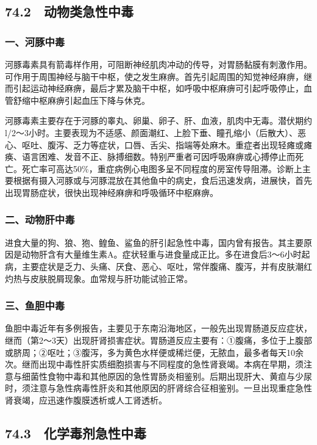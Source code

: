 \subsection{74.2　动物类急性中毒}

\subsubsection{一、河豚中毒}

河豚毒素具有箭毒样作用，可阻断神经肌肉冲动的传导，对胃肠黏膜有刺激作用。可作用于周围神经与脑干中枢，使之发生麻痹。首先引起周围的知觉神经麻痹，继而引起运动神经麻痹，最后才累及脑干中枢，如呼吸中枢麻痹可引起呼吸停止，血管舒缩中枢麻痹引起血压下降与休克。

河豚毒素主要存在于河豚的睾丸、卵巢、卵子、肝、血液，肌肉中无毒。潜伏期约l/2～3小时。主要表现为不适感、颜面潮红、上脸下垂、瞳孔缩小（后散大）、恶心、呕吐、腹泻、乏力等症状，口唇、舌尖、指端等处麻木。重症者出现轻瘫或瘫痪、语言困难、发音不正、脉搏细数。特别严重者可因呼吸麻痹或心搏停止而死亡。死亡率可高达50\%，重症病例心电图多呈不同程度的房室传导阻滞。诊断上主要根据有摄入河豚或与河豚混放在其他鱼中的病史，食后迅速发病，进展快，首先出现胃肠症状，很快出现神经麻痹和呼吸循环中枢麻痹。

\subsubsection{二、动物肝中毒}

进食大量的狗、狼、狍、鳇鱼、鲨鱼的肝引起急性中毒，国内曾有报告。其主要原因是动物肝含有大量维生素A。症状轻重与进食量成正比。多在进食后3～6小时起病，主要症状是乏力、头痛、厌食、恶心、呕吐，常伴腹痛、腹泻，并有皮肤潮红灼热与皮肤脱屑现象。血常规与肝功能试验正常。

\subsubsection{三、鱼胆中毒}

鱼胆中毒近年有多例报告，主要见于东南沿海地区，一般先出现胃肠道反应症状，继而（第2～3天）出现肝肾损害症状。胃肠道反应主要有：①腹痛，多位于上腹部或脐周；②呕吐；③腹泻，多为黄色水样便或稀烂便，无脓血，最多者每天10余次。继而出现中毒性肝实质细胞损害与不同程度的急性肾衰竭。本病在早期，须注意与细菌性食物中毒和其他原因的急性胃肠炎相鉴别。后期出现肝大、黄疸与少尿时，须注意与急性病毒性肝炎和其他原因的肝肾综合征相鉴别。一旦出现重症急性肾衰竭，应迅速作腹膜透析或人工肾透析。

\subsection{74.3　化学毒剂急性中毒}

